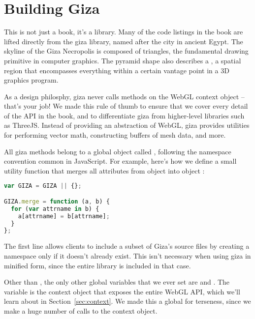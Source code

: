 \section{Building Giza}

This is not just a book, it's a library.  Many of the code listings in the book are lifted directly from the giza library, named after the city in ancient Egypt.  The skyline of the Giza Necropolis is composed of triangles, the fundamental drawing primitive in computer graphics.  The pyramid shape also describes a , a spatial region that encompasses everything within a certain vantage point in a 3D graphics program.

As a design philosphy, giza never calls methods on the WebGL context object -- that's your job!  We made this rule of thumb to ensure that we cover every detail of the API in the book, and to differentiate giza from higher-level libraries such as ThreeJS.  Instead of providing an abstraction of WebGL, giza provides utilities for performing vector math, constructing buffers of mesh data, and more.

All giza methods belong to a global object called , following the namespace convention common in JavaScript.  For example, here's how we define a small utility function that merges all attributes from object  into object :

\begin{lstlisting}[language=JavaScript]
var GIZA = GIZA || {};

GIZA.merge = function (a, b) {
  for (var attrname in b) {
    a[attrname] = b[attrname];
  }
};
\end{lstlisting}

The first line allows clients to include a subset of Giza's source files by creating a  namespace only if it doesn't already exist.  This isn't necessary when using giza in minified form, since the entire library is included in that case.

Other than , the only other global variables that we ever set are  and .  The  variable is the context object that exposes the entire WebGL API, which we'll learn about in Section~\ref{sec:context}.  We made this a global for terseness, since we make a huge number of calls to the context object.

